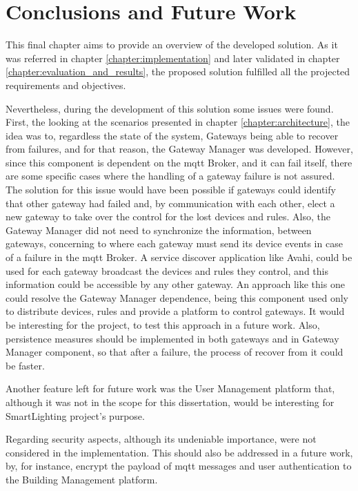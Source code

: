 \chapter{Conclusions and Future Work}
\label{chapter:conclusions}

This final chapter aims to provide an overview of the developed solution. As it was referred in chapter \ref{chapter:implementation} and later validated in chapter \ref{chapter:evaluation_and_results}, the proposed solution fulfilled all the projected requirements and objectives. 

Nevertheless, during the development of this solution some issues were found. First, the looking at the scenarios presented in chapter \ref{chapter:architecture}, the idea was to, regardless the state of the system, Gateways being able to recover from failures, and for that reason, the Gateway Manager was developed. However, since this component is dependent on the \ac{mqtt} Broker, and it can fail itself, there are some specific cases where the handling of a gateway failure is not assured. The solution for this issue would have been possible if gateways could identify that other gateway had failed and, by communication with each other, elect a new gateway to take over the control for the lost devices and rules. Also, the Gateway Manager did not need to synchronize the information, between gateways, concerning to where each gateway must send its device events in case of a failure in the \ac{mqtt} Broker. A service discover application like Avahi, could be used for each gateway broadcast the devices and rules they control, and this information could be accessible by any other gateway. An approach like this one could resolve the Gateway Manager dependence, being this component used only to distribute devices, rules and provide a platform to control gateways. It would be interesting for the project, to test this approach in a future work. Also, persistence measures should be implemented in both gateways and in Gateway Manager component, so that after a failure, the process of recover from it could be faster.

Another feature left for future work was the User Management platform that, although it was not in the scope for this dissertation, would be interesting for SmartLighting project's purpose.

Regarding security aspects, although its undeniable importance, were not considered in the implementation. This should also be addressed in a future work, by, for instance, encrypt the payload of \ac{mqtt} messages and user authentication to the Building Management platform.
